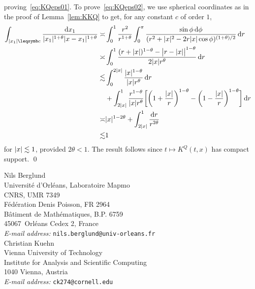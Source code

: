 \documentclass[reqno,11pt]{article}
\def\KQ{K^Q}
\begin{document}
proving~\eqref{eq:KQeps01}. To prove~\eqref{eq:KQeps02}, we use spherical
coordinates as in the proof of Lemma~\ref{lem:KKQ} to get, for any constant
$c$ of order $1$,
\begin{align*}
\int_{\abs{x_1}\leqs c} \frac{\6x_1}{\abs{x_1}^{1+\theta}
\abs{x-x_1}^{1+\theta}} 
\asymp&{} \int_0^1 \frac{r^2}{r^{1+\theta}} \int_0^\pi 
\frac{\sin\phi\6\phi}{(r^2+\abs{x}^2-2r\abs{x}\cos\phi)^{(1+\theta)/2}} \6r \\
\asymp&{} \int_0^1 \frac{(r+\abs{x})^{1-\theta} - \bigabs{r-\abs{x}}^{1-\theta}}
{2\abs{x}r^\theta}\6r \\
\lesssim&{} \int_0^{2\abs{x}} \frac{\abs{x}^{1-\theta}}{\abs{x}r^\theta}\6r \\
&{}+ \int_{2\abs{x}}^1 \frac{r^{1-\theta}}{\abs{x}r^\theta} 
\biggbrak{\biggpar{1+\frac{\abs{x}}{r}}^{1-\theta} -
\biggpar{1-\frac{\abs{x}}{r}}^{1-\theta}} \6r  \\
\asymp&{} \abs{x}^{1-2\theta} + \int_{2\abs{x}}^1 \frac{\6r}{r^{2\theta}} \\
\lesssim&{} 1
\end{align*}
for $\lvert x\rvert\lesssim 1$, provided $2\theta < 1$. The result follows since
$t\mapsto\KQ(t,x)$ has compact support. 
\qed


\newpage


\small

%               
               

\newpage
\tableofcontents


\goodbreak


\vfill


\bigskip\bigskip\noindent
{\small 
Nils Berglund \\ 
Universit\'e d'Orl\'eans, Laboratoire {\sc Mapmo} \\
{\sc CNRS, UMR 7349} \\
F\'ed\'eration Denis Poisson, FR 2964 \\
B\^atiment de Math\'ematiques, B.P. 6759\\
45067~Orl\'eans Cedex 2, France \\
{\it E-mail address: }{\tt nils.berglund@univ-orleans.fr}\\

\noindent 
Christian Kuehn \\
Vienna University of Technology \\ 
Institute for Analysis and Scientific Computing\\
1040 Vienna, Austria\\
{\it E-mail address: }{\tt ck274@cornell.edu}
}


\end{document}
